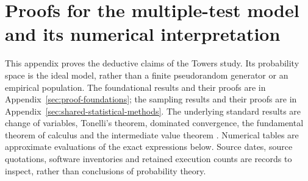 \chapter{Proofs for the multiple-test model and its numerical interpretation}
\label{sec:towers-proofs}

This appendix proves the deductive claims of the Towers study. Its probability
space is the ideal model, rather than a finite pseudorandom generator or an
empirical population. The foundational results and their proofs are in
Appendix~\ref{sec:proof-foundations}; the sampling results and their proofs are
in Appendix~\ref{sec:shared-statistical-methods}. The underlying standard
results are change of variables, Tonelli's theorem, dominated convergence,
the fundamental theorem of calculus and the intermediate value theorem
\citep{durrett2019,gallager2013}. Numerical tables are approximate evaluations
of the exact expressions below. Source dates, source quotations, software
inventories and retained execution counts are records to inspect, rather
than conclusions of probability theory.

